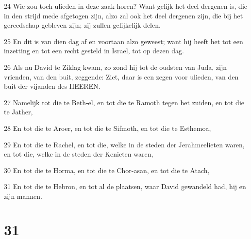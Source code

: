 \par 24 Wie zou toch ulieden in deze zaak horen? Want gelijk het deel dergenen is, die in den strijd mede afgetogen zijn, alzo zal ook het deel dergenen zijn, die bij het gereedschap gebleven zijn; zij zullen gelijkelijk delen.
\par 25 En dit is van dien dag af en voortaan alzo geweest; want hij heeft het tot een inzetting en tot een recht gesteld in Israel, tot op dezen dag.
\par 26 Als nu David te Ziklag kwam, zo zond hij tot de oudsten van Juda, zijn vrienden, van den buit, zeggende: Ziet, daar is een zegen voor ulieden, van den buit der vijanden des HEEREN.
\par 27 Namelijk tot die te Beth-el, en tot die te Ramoth tegen het zuiden, en tot die te Jather,
\par 28 En tot die te Aroer, en tot die te Sifmoth, en tot die te Esthemoa,
\par 29 En tot die te Rachel, en tot die, welke in de steden der Jerahmeelieten waren, en tot die, welke in de steden der Kenieten waren,
\par 30 En tot die te Horma, en tot die te Chor-asan, en tot die te Atach,
\par 31 En tot die te Hebron, en tot al de plaatsen, waar David gewandeld had, hij en zijn mannen.

\chapter{31}

